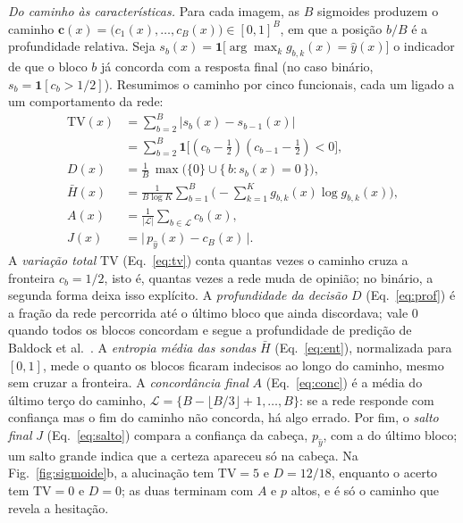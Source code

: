 \textit{Do caminho às características.}
Para cada imagem, as $B$ sigmoides produzem o caminho $\mathbf{c}(x) = \big(c_1(x), \dots, c_B(x)\big) \in [0,1]^B$, em que a posição
$b/B$ é a profundidade relativa. Seja $s_b(x) = \mathbf{1}\big[\arg\max_k g_{b,k}(x) = \hat y(x)\big]$ o indicador de que o bloco $b$ já
concorda com a resposta final (no caso binário, $s_b = \mathbf{1}[c_b > 1/2]$). Resumimos o caminho por cinco funcionais, cada um ligado
a um comportamento da rede:
\begin{align}
  \mathrm{TV}(x) &= \sum_{b=2}^{B} \big| s_b(x) - s_{b-1}(x) \big| \nonumber\\
     &= \sum_{b=2}^{B} \mathbf{1}\big[(c_b - \tfrac12)(c_{b-1} - \tfrac12) < 0\big], \label{eq:tv}\\
  D(x) &= \frac{1}{B}\,\max\big(\{0\} \cup \{\, b : s_b(x) = 0 \,\}\big), \label{eq:prof}\\
  \bar H(x) &= \frac{1}{B\log K} \sum_{b=1}^{B} \Big( -\sum_{k=1}^{K} g_{b,k}(x)\log g_{b,k}(x) \Big), \label{eq:ent}\\
  A(x) &= \frac{1}{|\mathcal{L}|} \sum_{b \in \mathcal{L}} c_b(x), \label{eq:conc}\\
  J(x) &= \big|\, p_{\hat y}(x) - c_B(x) \,\big|. \label{eq:salto}
\end{align}
A \emph{variação total} $\mathrm{TV}$ (Eq.~\ref{eq:tv}) conta quantas vezes o caminho cruza a fronteira $c_b = 1/2$, isto é, quantas vezes
a rede muda de opinião; no binário, a segunda forma deixa isso explícito. A \emph{profundidade da decisão} $D$ (Eq.~\ref{eq:prof}) é a
fração da rede percorrida até o último bloco que ainda discordava; vale 0 quando todos os blocos concordam e segue a profundidade de
predição de Baldock et al.~\cite{baldock2021}. A \emph{entropia média das sondas} $\bar H$ (Eq.~\ref{eq:ent}), normalizada para $[0,1]$,
mede o quanto os blocos ficaram indecisos ao longo do caminho, mesmo sem cruzar a fronteira. A \emph{concordância final} $A$
(Eq.~\ref{eq:conc}) é a média do último terço do caminho, $\mathcal{L} = \{B - \lfloor B/3 \rfloor + 1, \dots, B\}$: se a rede responde com confiança mas o fim do caminho não concorda, há algo
errado. Por fim, o \emph{salto final} $J$ (Eq.~\ref{eq:salto}) compara a confiança da cabeça, $p_{\hat y}$, com a do último bloco; um salto
grande indica que a certeza apareceu só na cabeça. Na Fig.~\ref{fig:sigmoide}b, a alucinação tem $\mathrm{TV}=5$ e $D=12/18$, enquanto o acerto tem
$\mathrm{TV}=0$ e $D=0$; as duas terminam com $A$ e $p$ altos, e é só o caminho que revela a hesitação.

